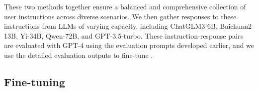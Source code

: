 

These two methods together ensure a balanced and comprehensive collection of user instructions across diverse scenarios. We then gather responses to these instructions from LLMs of varying capacity, including ChatGLM3-6B, Baichuan2-13B, Yi-34B, Qwen-72B, and GPT-3.5-turbo. 
These instruction-response pairs are evaluated with GPT-4 using the evaluation prompts developed earlier, and we use the detailed evaluation outputs to fine-tune \modelname.




\subsection{Fine-tuning} 
\label{subsec:finetuning}

